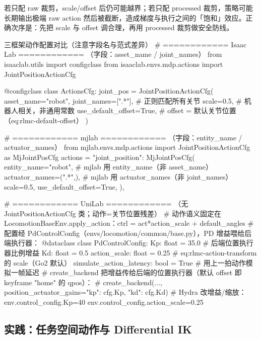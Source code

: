 \begin{pitfall}
若只配 raw 裁剪，scale/offset 后仍可能越界；若只配 processed 裁剪，策略可能长期输出极端 raw action 然后被截断，造成梯度与执行之间的「饱和」效应。正确次序是：先把 scale 与 offset 调合理，再用 processed 裁剪做安全防线。
\end{pitfall}

\begin{codebox}[Python]{三框架动作配置对比（注意字段名与范式差异）}
# ============ Isaac Lab ============ （字段：asset_name / joint_names）
from isaaclab.utils import configclass
from isaaclab.envs.mdp.actions import JointPositionActionCfg

@configclass
class ActionsCfg:
    joint_pos = JointPositionActionCfg(
        asset_name="robot",
        joint_names=[".*"],            # 正则匹配所有关节
        scale=0.5,                     # 机器人相关，非通用常数
        use_default_offset=True,       # offset = 默认关节位置（eq:rlmc-default-offset）
    )

# ============ mjlab ============ （字段：entity_name / actuator_names）
from mjlab.envs.mdp.actions import JointPositionActionCfg as MjJointPosCfg
actions = {
    "joint_position": MjJointPosCfg(
        entity_name="robot",           # mjlab 用 entity_name（非 asset_name）
        actuator_names=(".*",),        # mjlab 用 actuator_names（非 joint_names）
        scale=0.5,
        use_default_offset=True,
    ),
}

# ============ UniLab ============ （无 JointPositionActionCfg 类；动作=关节位置残差）
# 动作语义固定在 LocomotionBaseEnv.apply_action：ctrl = act*action_scale + default_angles
# 配置经 PdControlConfig（envs/locomotion/common/base.py），PD 增益喂给后端执行器：
@dataclass
class PdControlConfig:
    Kp: float = 35.0                   # 后端位置执行器比例增益
    Kd: float = 0.5
    action_scale: float = 0.25         # eq:rlmc-action-transform 的 scale（Go2 默认）
    simulate_action_latency: bool = True   # 用上一拍动作模拟一帧延迟
# create_backend 把增益传给后端的位置执行器（默认 offset 即 keyframe "home" 的 qpos）：
#   create_backend(..., position_actuator_gains={"kp": cfg.Kp, "kd": cfg.Kd})
# Hydra 改增益/缩放：env.control_config.Kp=40 env.control_config.action_scale=0.25
\end{codebox}

\subsection{实践：任务空间动作与 Differential IK}
\label{sec:rlmc-diffik}

